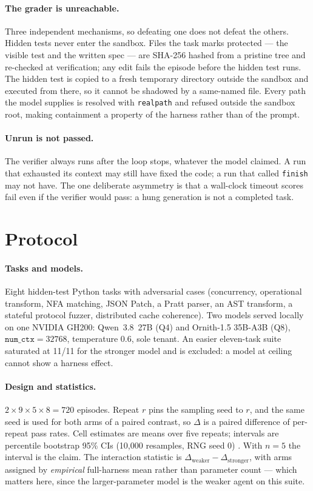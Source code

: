 \documentclass[10pt]{article}
\begin{document}
\paragraph{The grader is unreachable.} Three independent mechanisms, so defeating one does not
defeat the others. Hidden tests never enter the sandbox. Files the task marks protected --- the
visible test and the written spec --- are SHA-256 hashed from a pristine tree and re-checked at
verification; any edit fails the episode before the hidden test runs. The hidden test is copied
to a fresh temporary directory outside the sandbox and executed from there, so it cannot be
shadowed by a same-named file. Every path the model supplies is resolved with
\texttt{realpath} and refused outside the sandbox root, making containment a property of the
harness rather than of the prompt.

\paragraph{Unrun is not passed.} The verifier always runs after the loop stops, whatever the
model claimed. A run that exhausted its context may still have fixed the code; a run that
called \texttt{finish} may not have. The one deliberate asymmetry is that a wall-clock timeout
scores fail even if the verifier would pass: a hung generation is not a completed task.

\section{Protocol}
\label{sec:protocol}

\paragraph{Tasks and models.} Eight hidden-test Python tasks with adversarial cases
(concurrency, operational transform, NFA matching, JSON Patch, a Pratt parser, an AST
transform, a stateful protocol fuzzer, distributed cache coherence). Two models served locally
on one NVIDIA GH200: Qwen~3.8~27B (Q4) and Ornith-1.5 35B-A3B (Q8), $\texttt{num\_ctx}=32768$,
temperature 0.6, sole tenant. An easier eleven-task suite saturated at 11/11 for the stronger
model and is excluded: a model at ceiling cannot show a harness effect.

\paragraph{Design and statistics.} $2 \times 9 \times 5 \times 8 = 720$ episodes. Repeat $r$
pins the sampling seed to $r$, and the same seed is used for both arms of a paired contrast,
so $\Delta$ is a paired difference of per-repeat pass rates. Cell estimates are means over five
repeats; intervals are percentile bootstrap 95\% CIs (10{,}000 resamples, RNG seed 0)
\citep{bootstrap}. With $n=5$ the interval is the claim. The interaction statistic is
$\Delta_{\text{weaker}} - \Delta_{\text{stronger}}$, with arms assigned by \emph{empirical}
full-harness mean rather than parameter count --- which matters here, since the
larger-parameter model is the weaker agent on this suite.
\end{document}
